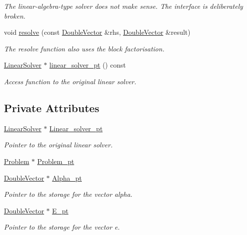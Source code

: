 \begin{DoxyCompactItemize}
\begin{DoxyCompactList}\small\item\em The linear-\/algebra-\/type solver does not make sense. The interface is deliberately broken. \end{DoxyCompactList}\item 
void \hyperlink{classoomph_1_1AugmentedBlockFoldLinearSolver_a7728fc74802b6802ed966765bc1e62d9}{resolve} (const \hyperlink{classoomph_1_1DoubleVector}{Double\+Vector} \&rhs, \hyperlink{classoomph_1_1DoubleVector}{Double\+Vector} \&result)
\begin{DoxyCompactList}\small\item\em The resolve function also uses the block factorisation. \end{DoxyCompactList}\item 
\hyperlink{classoomph_1_1LinearSolver}{Linear\+Solver} $\ast$ \hyperlink{classoomph_1_1AugmentedBlockFoldLinearSolver_a565f2b65d78f91ccac3fe2b03ac57dfc}{linear\+\_\+solver\+\_\+pt} () const
\begin{DoxyCompactList}\small\item\em Access function to the original linear solver. \end{DoxyCompactList}\end{DoxyCompactItemize}
\subsection*{Private Attributes}
\begin{DoxyCompactItemize}
\item 
\hyperlink{classoomph_1_1LinearSolver}{Linear\+Solver} $\ast$ \hyperlink{classoomph_1_1AugmentedBlockFoldLinearSolver_a1e8706ee6a97424bcbaf1992a09549ee}{Linear\+\_\+solver\+\_\+pt}
\begin{DoxyCompactList}\small\item\em Pointer to the original linear solver. \end{DoxyCompactList}\item 
\hyperlink{classoomph_1_1Problem}{Problem} $\ast$ \hyperlink{classoomph_1_1AugmentedBlockFoldLinearSolver_a65a5a2a87943d506cf4afc5cdbcfc06f}{Problem\+\_\+pt}
\item 
\hyperlink{classoomph_1_1DoubleVector}{Double\+Vector} $\ast$ \hyperlink{classoomph_1_1AugmentedBlockFoldLinearSolver_ae4f2e27925a6ceef247bac84f49fdb90}{Alpha\+\_\+pt}
\begin{DoxyCompactList}\small\item\em Pointer to the storage for the vector alpha. \end{DoxyCompactList}\item 
\hyperlink{classoomph_1_1DoubleVector}{Double\+Vector} $\ast$ \hyperlink{classoomph_1_1AugmentedBlockFoldLinearSolver_a6793e6c00a07d6a037f12b78c7d32182}{E\+\_\+pt}
\begin{DoxyCompactList}\small\item\em Pointer to the storage for the vector e. \end{DoxyCompactList}\end{DoxyCompactItemize}
